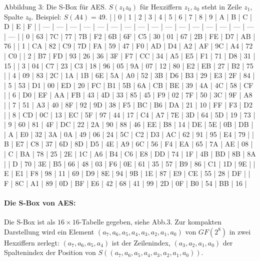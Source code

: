 \documentclass[a4paper]{article}
\begin{document}
\begin{multicols}{3}
    Abbildung 3: Die S-Box für AES. $S(z_1 z_0)$ für Hexziffern $z_1,z_0$ steht in Zeile $z_1$, Spalte $z_0$. Beispiel: $S(A4)=49$.
    |     | 0   | 1   | 2   | 3   | 4   | 5   | 6   | 7   | 8   | 9   | A   | B   | C   | D   | E   | F   |
    | --- | --- | --- | --- | --- | --- | --- | --- | --- | --- | --- | --- | --- | --- | --- | --- | --- |
    | 0   | 63  | 7C  | 77  | 7B  | F2  | 6B  | 6F  | C5  | 30  | 01  | 67  | 2B  | FE  | D7  | AB  | 76  |
    | 1   | CA  | 82  | C9  | 7D  | FA  | 59  | 47  | F0  | AD  | D4  | A2  | AF  | 9C  | A4  | 72  | C0  |
    | 2   | B7  | FD  | 93  | 26  | 36  | 3F  | F7  | CC  | 34  | A5  | E5  | F1  | 71  | D8  | 31  | 15  |
    | 3   | 04  | C7  | 23  | C3  | 18  | 96  | 05  | 9A  | 07  | 12  | 80  | E2  | EB  | 27  | B2  | 75  |
    | 4   | 09  | 83  | 2C  | 1A  | 1B  | 6E  | 5A  | A0  | 52  | 3B  | D6  | B3  | 29  | E3  | 2F  | 84  |
    | 5   | 53  | D1  | 00  | ED  | 20  | FC  | B1  | 5B  | 6A  | CB  | BE  | 39  | 4A  | 4C  | 58  | CF  |
    | 6   | D0  | EF  | AA  | FB  | 43  | 4D  | 33  | 85  | 45  | F9  | 02  | 7F  | 50  | 3C  | 9F  | A8  |
    | 7   | 51  | A3  | 40  | 8F  | 92  | 9D  | 38  | F5  | BC  | B6  | DA  | 21  | 10  | FF  | F3  | D2  |
    | 8   | CD  | 0C  | 13  | EC  | 5F  | 97  | 44  | 17  | C4  | A7  | 7E  | 3D  | 64  | 5D  | 19  | 73  |
    | 9   | 60  | 81  | 4F  | DC  | 22  | 2A  | 90  | 88  | 46  | EE  | B8  | 14  | DE  | 5E  | 0B  | DB  |
    | A   | E0  | 32  | 3A  | 0A  | 49  | 06  | 24  | 5C  | C2  | D3  | AC  | 62  | 91  | 95  | E4  | 79  |
    | B   | E7  | C8  | 37  | 6D  | 8D  | D5  | 4E  | A9  | 6C  | 56  | F4  | EA  | 65  | 7A  | AE  | 08  |
    | C   | BA  | 78  | 25  | 2E  | 1C  | A6  | B4  | C6  | E8  | DD  | 74  | 1F  | 4B  | BD  | 8B  | 8A  |
    | D   | 70  | 3E  | B5  | 66  | 48  | 03  | F6  | 0E  | 61  | 35  | 57  | B9  | 86  | C1  | 1D  | 9E  |
    | E   | E1  | F8  | 98  | 11  | 69  | D9  | 8E  | 94  | 9B  | 1E  | 87  | E9  | CE  | 55  | 28  | DF  |
    | F   | 8C  | A1  | 89  | 0D  | BF  | E6  | 42  | 68  | 41  | 99  | 2D  | 0F  | B0  | 54  | BB  | 16  |

    \paragraph{Die S-Box von AES:}
    Die S-Box ist als $16\times 16$-Tabelle gegeben, siehe Abb.3. Zur kompakten Darstellung wird ein Element $(a_7,a_6,a_5,a_4,a_3,a_2,a_1,a_0)$ von $GF(2^8)$ in zwei Hexziffern zerlegt: $(a_7,a_6,a_5,a_4)$ ist der Zeilenindex, $(a_3,a_2,a_1,a_0)$ der Spaltenindex der Position von $S((a_7,a_6,a_5,a_4,a_3,a_2,a_1,a_0))$.


\end{multicols}
\end{document}
